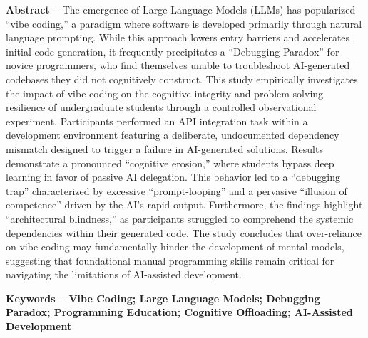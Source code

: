 \noindent 
\textbf{Abstract -- } The emergence of Large Language Models (LLMs) has popularized ``vibe coding,'' a paradigm where software is developed primarily through natural language prompting. While this approach lowers entry barriers and accelerates initial code generation, it frequently precipitates a ``Debugging Paradox'' for novice programmers, who find themselves unable to troubleshoot AI-generated codebases they did not cognitively construct. This study empirically investigates the impact of vibe coding on the cognitive integrity and problem-solving resilience of undergraduate students through a controlled observational experiment. Participants performed an API integration task within a development environment featuring a deliberate, undocumented dependency mismatch designed to trigger a failure in AI-generated solutions. Results demonstrate a pronounced ``cognitive erosion,'' where students bypass deep learning in favor of passive AI delegation. This behavior led to a ``debugging trap'' characterized by excessive ``prompt-looping'' and a pervasive ``illusion of competence'' driven by the AI's rapid output. Furthermore, the findings highlight ``architectural blindness,'' as participants struggled to comprehend the systemic dependencies within their generated code. The study concludes that over-reliance on vibe coding may fundamentally hinder the development of mental models, suggesting that foundational manual programming skills remain critical for navigating the limitations of AI-assisted development.

\smallskip
\smallskip

\textbf{Keywords -- Vibe Coding; Large Language Models; Debugging Paradox; Programming Education; Cognitive Offloading; AI-Assisted Development}